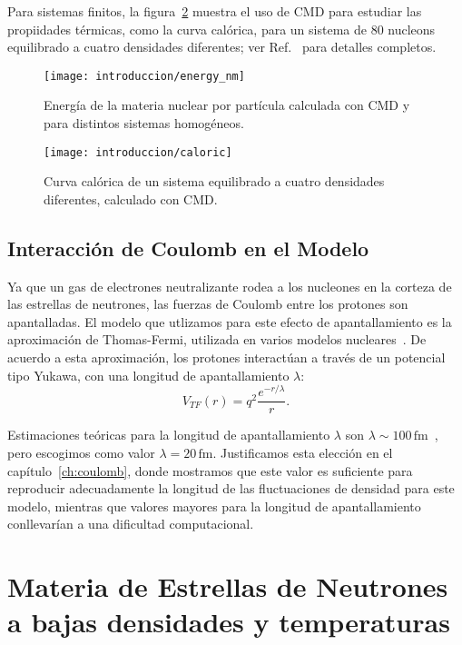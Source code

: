 Para sistemas finitos, la figura~\ref{fig:caloric} muestra el uso de CMD para estudiar las propiidades térmicas, como la curva calórica, para un sistema de 80 nucleons equilibrado a cuatro densidades diferentes; ver Ref.~\cite{dorso_isoscaling_2011} para detalles completos.

\begin{figure}[h]
  \centering
  \texttt{[image: introduccion/energy\_nm]}
  \caption{Energía de la materia nuclear por partícula calculada con CMD y para distintos sistemas homogéneos.}
  \label{fig:energy_nm}
\end{figure}


\begin{figure}[h]
  \centering
  \texttt{[image: introduccion/caloric]}
  \caption{Curva calórica de un sistema equilibrado a cuatro densidades diferentes, calculado con CMD.}
  \label{fig:caloric}
\end{figure}


\subsection{Interacción de Coulomb en el Modelo}\label{sc:coulomb}

Ya que un gas de electrones neutralizante rodea a los nucleones en la corteza de las estrellas de neutrones, las fuerzas de Coulomb entre los protones son apantalladas.
El modelo que utlizamos para este efecto de apantallamiento es la aproximación de Thomas-Fermi, utilizada en varios modelos nucleares~\cite{maruyama_quantum_1998, dorso_topological_2012, horowitz_neutrino-pasta_2004}.
De acuerdo a esta aproximación, los protones interactúan a través de un potencial tipo Yukawa, con una longitud de apantallamiento $\lambda$:
\begin{equation*}
 V_{TF}(r) = q^2\frac{e^{-r/\lambda}}{r}.
\end{equation*}

Estimaciones teóricas para la longitud de apantallamiento $\lambda$ son $\lambda\sim100\,\text{fm}$~\cite{fetter_quantum_2003}, pero escogimos como valor $\lambda=20\,\text{fm}$.
Justificamos esta elección en el capítulo~\ref{ch:coulomb}, donde mostramos que este valor es suficiente para reproducir adecuadamente la longitud de las fluctuaciones de densidad para este modelo, mientras que valores mayores para la longitud de apantallamiento conllevarían a una dificultad computacional.

\section{Materia de Estrellas de Neutrones a bajas densidades y temperaturas}\label{sc:nsm_lowd}

